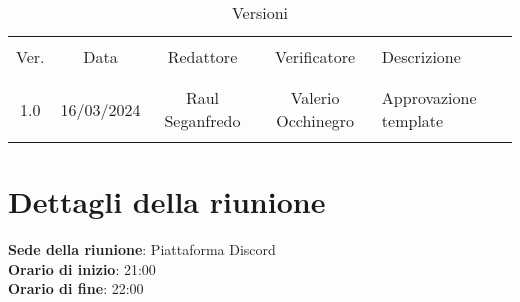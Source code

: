 \documentclass[italian,12pt]{article}
\begin{document}


\newpage



\begin{table}[!h]
	\caption{Versioni}
	\footnotesize
	\begin{center}
		\begin{tabular}{ c c c c p{6.1cm} }
			\hline                                                                              \\[-2ex]
			Ver. & Data       & Redattore          & Verificatore       & Descrizione           \\
			\\[-2ex] \hline \\[-1.5ex]
			1.0  & 16/03/2024 & Raul Seganfredo    & Valerio Occhinegro & Approvazione template \\
			\\[-1.5ex] \hline
		\end{tabular}
	\end{center}
\end{table}

\newpage

\tableofcontents

\newpage

\section{Dettagli della riunione}


\textbf{Sede della riunione}: Piattaforma Discord\\
\textbf{Orario di inizio}: 21:00\\
\textbf{Orario di fine}: 22:00\\
\end{document}
